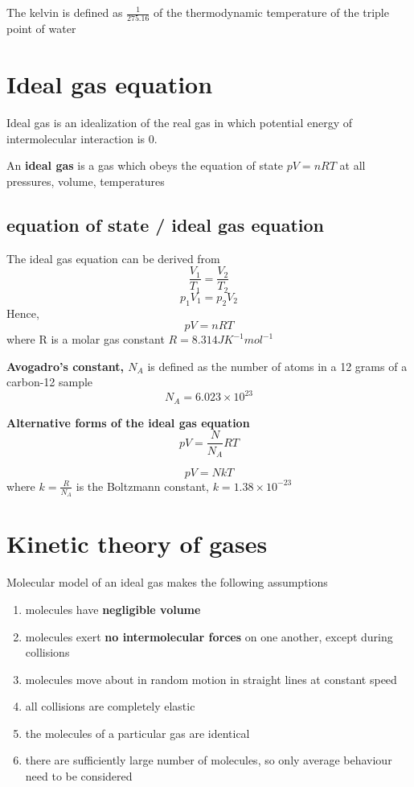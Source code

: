 \documentclass[a4paper, 10pt]{article}
\begin{document}
\begin{framed}
   The kelvin is defined as $\frac{1}{275.16}$ of the thermodynamic temperature of the triple point of water
\end{framed}	

\section{Ideal gas equation}
Ideal gas is an idealization of the real gas in which potential energy of intermolecular interaction is 0. 

\begin{framed}
   An \textbf{ideal gas} is a gas which obeys the equation of state $pV = nRT$  at all pressures, volume, temperatures
\end{framed}	

\subsection{equation of state / ideal gas equation}
The ideal gas equation can be derived from 
\[
\frac{V_1}{T_1} = \frac{V_2}{T_2}
\]
\[
   p_1V_1 = p_2 V_2
\]
Hence, 
\[
pV = nRT
\]
where R is a molar gas constant $R = 8.314J K^{-1} mol^{-1}$ 


\textbf{Avogadro's constant, $N_A$} is defined as the number of atoms in a 12 grams of a carbon-12 sample
\[
   N_A = 6.023 \times 10 ^{23}
\]

\textbf{Alternative forms of the ideal gas equation}
\[
pV = \frac{N}{N_A} RT
\]

\[
pV = NkT 
\]
where $k = \frac{R}{N_A}$ is the Boltzmann constant, $k = 1.38 \times 10^{-23}$ 

\section{Kinetic theory of gases}

Molecular model of an ideal gas makes the following assumptions
\begin{enumerate}
   \item molecules have \textbf{negligible volume}
   \item molecules exert \textbf{no intermolecular forces} on one another, except during collisions
   \item molecules move about in random motion in straight lines at constant speed
   \item all collisions are completely elastic
   \item the molecules of a particular gas are identical
   \item there are sufficiently large number of molecules, so only average behaviour need to be considered
\end{enumerate}	
\end{document}
